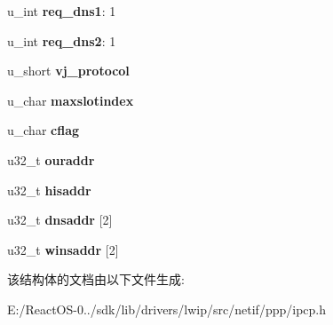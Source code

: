 \begin{DoxyCompactItemize}
\item 
\mbox{\label{structipcp__options_af191188a8b5d2a58b01a61b03b587ec0}} 
u\+\_\+int {\bfseries req\+\_\+dns1}\+: 1
\item 
\mbox{\label{structipcp__options_aafc71b69fd71daec97c944a7de767931}} 
u\+\_\+int {\bfseries req\+\_\+dns2}\+: 1
\item 
\mbox{\label{structipcp__options_a5a125f3fc67669f82a317ad994e5049f}} 
u\+\_\+short {\bfseries vj\+\_\+protocol}
\item 
\mbox{\label{structipcp__options_aa9f88f16f4e5fcb73075417b5692801b}} 
u\+\_\+char {\bfseries maxslotindex}
\item 
\mbox{\label{structipcp__options_a4b565c3b78c4ba1df45390e19dbb8cb2}} 
u\+\_\+char {\bfseries cflag}
\item 
\mbox{\label{structipcp__options_a2ddc2cba774be8d855d2dba7ac05b616}} 
u32\+\_\+t {\bfseries ouraddr}
\item 
\mbox{\label{structipcp__options_a409f493168195217446210bccc5adb83}} 
u32\+\_\+t {\bfseries hisaddr}
\item 
\mbox{\label{structipcp__options_afbd6f93cb74ee1994ecc8d03c1425ed0}} 
u32\+\_\+t {\bfseries dnsaddr} \mbox{[}2\mbox{]}
\item 
\mbox{\label{structipcp__options_ae54ccf2d63fc7eb0f109f85754f33295}} 
u32\+\_\+t {\bfseries winsaddr} \mbox{[}2\mbox{]}
\end{DoxyCompactItemize}


该结构体的文档由以下文件生成\+:\begin{DoxyCompactItemize}
\item 
E\+:/\+React\+O\+S-\/0../sdk/lib/drivers/lwip/src/netif/ppp/ipcp.\+h\end{DoxyCompactItemize}
